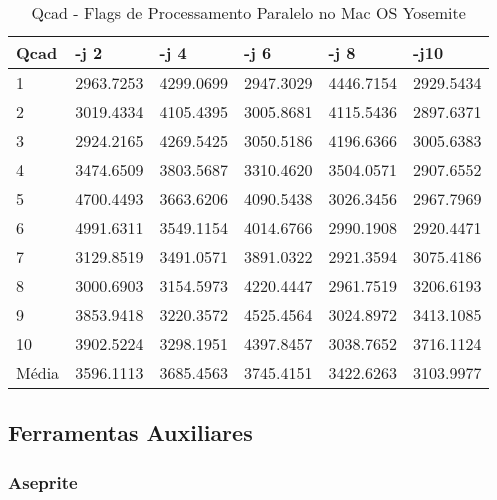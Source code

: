 \begin{table}[!ht]
\centering
\caption{Qcad - Flags de Processamento Paralelo no Mac OS Yosemite}
\label{tab:flag_processamento_paralelo:mac:qcad}
\begin{tabular}{llllll}
\textbf{Qcad} & \textbf{-j 2} & \textbf{-j 4} & \textbf{-j 6} & \textbf{-j 8} & \textbf{-j10}  \\ \toprule
1            & 2963.7253  &  4299.0699 &   2947.3029 &   4446.7154 &   2929.5434  \\ 
2            & 3019.4334  &  4105.4395 &   3005.8681 &   4115.5436 &   2897.6371  \\ 
3            & 2924.2165  &  4269.5425 &   3050.5186 &   4196.6366 &   3005.6383  \\ 
4            & 3474.6509  &  3803.5687 &   3310.4620 &   3504.0571 &   2907.6552  \\ 
5            & 4700.4493  &  3663.6206 &   4090.5438 &   3026.3456 &   2967.7969  \\ 
6            & 4991.6311  &  3549.1154 &   4014.6766 &   2990.1908 &   2920.4471  \\ 
7            & 3129.8519  &  3491.0571 &   3891.0322 &   2921.3594 &   3075.4186  \\ 
8            & 3000.6903  &  3154.5973 &   4220.4447 &   2961.7519 &   3206.6193  \\ 
9            & 3853.9418  &  3220.3572 &   4525.4564 &   3024.8972 &   3413.1085  \\ 
10           & 3902.5224  &  3298.1951 &   4397.8457 &   3038.7652 &   3716.1124  \\ \bottomrule
Média        & 3596.1113  &  3685.4563 &   3745.4151 &   3422.6263 &   3103.9977  \\ 
\end{tabular}
\end{table}


\clearpage
\subsection{Ferramentas Auxiliares}

\subsubsection*{Aseprite}

